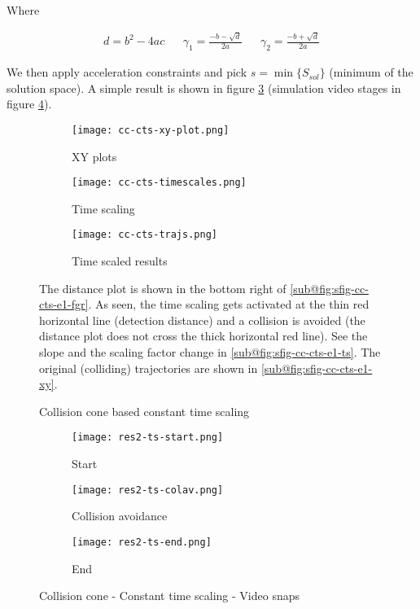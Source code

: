 Where

\begin{align*}
    d = b^2 - 4ac
    &&
    \gamma_1 = \frac{-b - \sqrt{d}}{2a}
    &&
    \gamma_2 = \frac{-b + \sqrt{d}}{2a}
\end{align*}

We then apply acceleration constraints and pick $s = \min\{S_{sol}\}$ (minimum of the solution space). A simple result is shown in figure \ref{fig:cc-cts-exp1-graphs} (simulation video stages in figure \ref{fig:cc-cts-exp1}).

\begin{figure}
    \centering
    \begin{subfigure}[b]{0.49\textwidth}
        \texttt{[image: cc-cts-xy-plot.png]}
        \caption{XY plots}
        \label{fig:sfig-cc-cts-e1-xy}
        \texttt{[image: cc-cts-timescales.png]}
        \caption{Time scaling}
        \label{fig:sfig-cc-cts-e1-ts}
    \end{subfigure}
    \begin{subfigure}[b]{0.49\textwidth}
        \texttt{[image: cc-cts-trajs.png]}
        \caption{Time scaled results}
        \label{fig:sfig-cc-cts-e1-fgr}
    \end{subfigure}
    \caption{Collision cone based constant time scaling}
    \label{fig:cc-cts-exp1-graphs}
    \small
        The distance plot is shown in the bottom right of \ref{sub@fig:sfig-cc-cts-e1-fgr}. As seen, the time scaling gets activated at the thin red horizontal line (detection distance) and a collision is avoided (the distance plot does not cross the thick horizontal red line). See the slope and the scaling factor change in \ref{sub@fig:sfig-cc-cts-e1-ts}. The original (colliding) trajectories are shown in \ref{sub@fig:sfig-cc-cts-e1-xy}.
\end{figure}

\begin{figure}
    \centering
    \begin{subfigure}[b]{0.3\textwidth}
        \texttt{[image: res2-ts-start.png]}
        \caption{Start}
    \end{subfigure}
    \begin{subfigure}[b]{0.3\textwidth}
        \texttt{[image: res2-ts-colav.png]}
        \caption{Collision avoidance}
    \end{subfigure}
    \begin{subfigure}[b]{0.3\textwidth}
        \texttt{[image: res2-ts-end.png]}
        \caption{End}
    \end{subfigure}
    \caption{Collision cone - Constant time scaling - Video snaps}
    \label{fig:cc-cts-exp1}
\end{figure}

